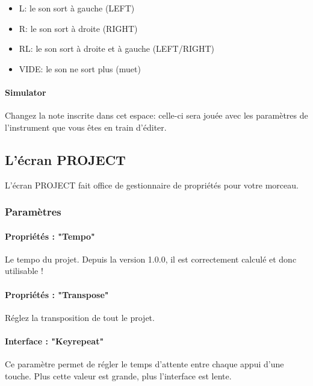 \documentclass[12pt,a4paper]{article}
\begin{document}
    \begin{itemize}
        \item{L: le son sort à gauche (LEFT)}
        \item{R: le son sort à droite (RIGHT)}
        \item{RL: le son sort à droite et à gauche (LEFT/RIGHT)}
        \item{VIDE: le son ne sort plus (muet)}
    \end{itemize}

    \paragraph{Simulator} Changez la note inscrite dans cet espace:
            celle-ci sera jouée avec les paramètres de l'instrument que vous êtes en train d'éditer.
    
    \subsection{L'écran PROJECT}
    
    L'écran PROJECT fait office de gestionnaire de propriétés pour votre morceau.
    

    \subsubsection{Paramètres}

    \paragraph{Propriétés : "Tempo"} Le tempo du projet.
            Depuis la version 1.0.0, il est correctement calculé et donc utilisable !

    \paragraph{Propriétés : "Transpose"} Réglez la transposition de tout le projet.

    \paragraph{Interface : "Keyrepeat"} Ce paramètre permet de régler le temps d'attente entre chaque appui d'une touche.
                                        Plus cette valeur est grande, plus l'interface est lente.
\end{document}
